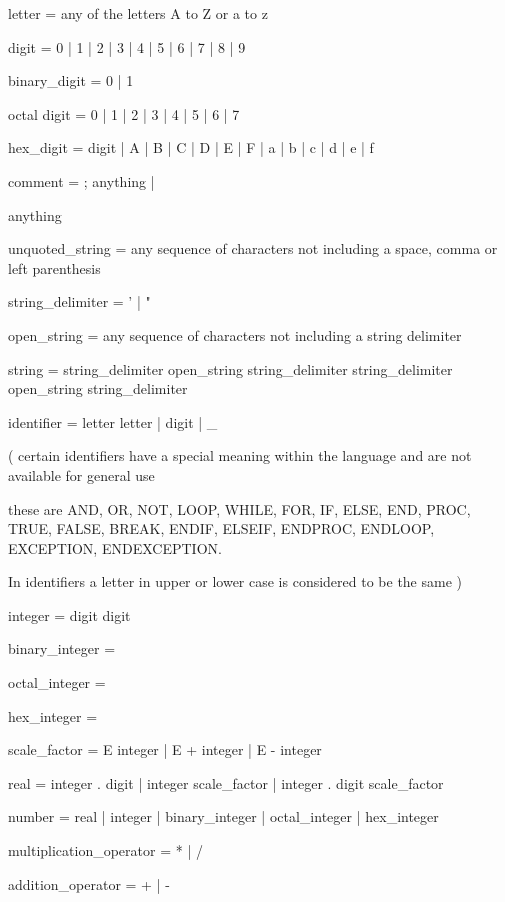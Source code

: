 \documentclass[twoside,11pt,nolof,chapters]{starlink}
\begin{document}
\begin{terminalv}

letter  =   any of the letters A to Z or a to z

digit   =   0 | 1 | 2 | 3 | 4 | 5 | 6 | 7 | 8 | 9

binary_digit  =  0 | 1

octal digit  =  0 | 1 | 2 | 3 | 4 | 5 | 6 | 7

hex_digit  =  digit | A | B | C | D | E | F | a | b | c | d | e | f

comment  =  ; anything   |
            { anything

unquoted_string  =  any sequence of characters not including a space,
                    comma or left parenthesis

string_delimiter  =  ' | "

open_string  =   any sequence of characters not including a string delimiter

string  =   string_delimiter  open_string  string_delimiter
            { string_delimiter  open_string  string_delimiter  }

identifier  =  letter  {  letter | digit | _  }

     ( certain identifiers have a special meaning within the language
       and are not available for general use

       these are  AND, OR, NOT, LOOP, WHILE, FOR, IF, ELSE, END, PROC,
                  TRUE, FALSE, BREAK, ENDIF, ELSEIF, ENDPROC, ENDLOOP,
                  EXCEPTION, ENDEXCEPTION.

       In identifiers a letter in upper or lower case is considered
       to be the same  )

integer  =  digit  {  digit  }

binary_integer  =  %

octal_integer  =  %

hex_integer  =  %

scale_factor  =  E  integer  |
                 E  +  integer  |
                 E  -  integer

real  =  integer  .  {  digit  }  |
         integer  scale_factor  |
	 integer  .  {  digit  }  scale_factor

number  =  real | integer | binary_integer | octal_integer | hex_integer

multiplication_operator  =  * | /

addition_operator  =  + | -

}
\end{terminalv}
\end{document}
